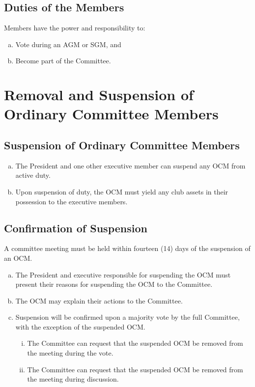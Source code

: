 \documentclass[a4paper,12pt]{article}
\begin{document}
\subsection{Duties of the Members}

Members have the power and responsibility to:

\begin{enumerate}[a)]
	\item Vote during an AGM or SGM, and
	\item Become part of the Committee.
\end{enumerate}

\section{Removal and Suspension of Ordinary Committee Members}

\subsection{Suspension of Ordinary Committee Members}

\begin{enumerate}[a)]
	\item The President and one other executive member can suspend any OCM from active duty.
	\item Upon suspension of duty, the OCM must yield any club assets in their possession to the executive members.
\end{enumerate}

\subsection{Confirmation of Suspension}

A committee meeting must be held within fourteen (14) days of the suspension of an OCM.

\begin{enumerate}[a)]
	\item The President and executive responsible for suspending the OCM must present their reasons for suspending the OCM to the Committee.
	\item The OCM may explain their actions to the Committee.
	\item Suspension will be confirmed upon a majority vote by the full Committee, with the exception of the suspended OCM.
	\begin{enumerate}[i)]
		\item The Committee can request that the suspended OCM be removed from the meeting during the vote.
		\item The Committee can request that the suspended OCM be removed from the meeting during discussion.
	\end{enumerate}
\end{enumerate}
\end{document}
